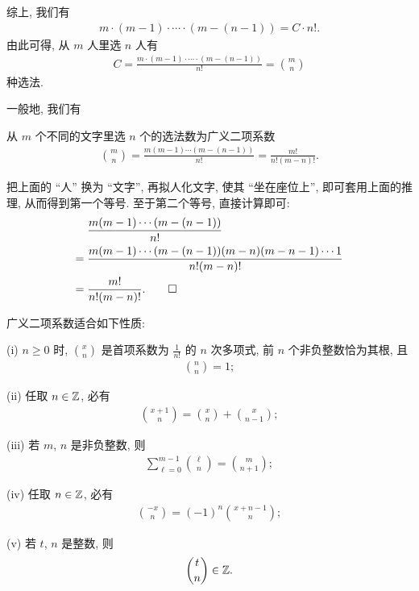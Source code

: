 综上, 我们有
\begin{align*}
    m \cdot (m-1) \cdot \cdots \cdot (m - (n - 1)) = C \cdot n!.
\end{align*}
由此可得, 从 $m$ 人里选 $n$ 人有
\begin{align*}
    C = \frac{m \cdot (m-1) \cdot \cdots \cdot (m - (n - 1))}{n!} = \binom{m}{n}
\end{align*}
种选法.

一般地, 我们有

\begin{proposition}
    从 $m$ 个不同的文字里选 $n$ 个的选法数为广义二项系数
    \begin{align*}
        \binom{m}{n} = \frac{m(m-1)\cdots(m - (n - 1))}{n!} = \frac{m!}{n! (m-n)!}.
    \end{align*}
\end{proposition}

\begin{pf}
    把上面的 ``人'' 换为 ``文字'', 再拟人化文字, 使其 ``坐在座位上'', 即可套用上面的推理, 从而得到第一个等号. 至于第二个等号, 直接计算即可:
    \begin{align*}
             & \frac{m(m-1)\cdots(m - (n - 1))}{n!}                                      \\
        = {} & \frac{m(m-1)\cdots(m - (n - 1))(m - n) (m - n - 1) \cdots 1}{n! (m - n)!} \\
        = {} & \frac{m!}{n! (m-n)!}. \qedhere
    \end{align*}
\end{pf}

\begin{proposition}
    广义二项系数适合如下性质:

    (i) $n \geq 0$ 时, $\binom{x}{n}$ 是首项系数为 $\frac{1}{n!}$ 的 $n$ 次多项式, 前 $n$ 个非负整数恰为其根, 且
    \begin{align*}
        \binom{n}{n} = 1;
    \end{align*}

    (ii) 任取 $n \in \mathbb{Z}$, 必有
    \begin{align*}
        \binom{x + 1}{n} = \binom{x}{n} + \binom{x}{n - 1};
    \end{align*}

    (iii) 若 $m$, $n$ 是非负整数, 则
    \begin{align*}
        \sum_{\ell = 0}^{m - 1} \binom{\ell}{n} = \binom{m}{n + 1};
    \end{align*}

    (iv) 任取 $n \in \mathbb{Z}$, 必有
    \begin{align*}
        \binom{-x}{n} = (-1)^n \binom{x + n - 1}{n};
    \end{align*}

    (v) 若 $t$, $n$ 是整数, 则
    \begin{align*}
        \binom{t}{n} \in \mathbb{Z}.
    \end{align*}
\end{proposition}

